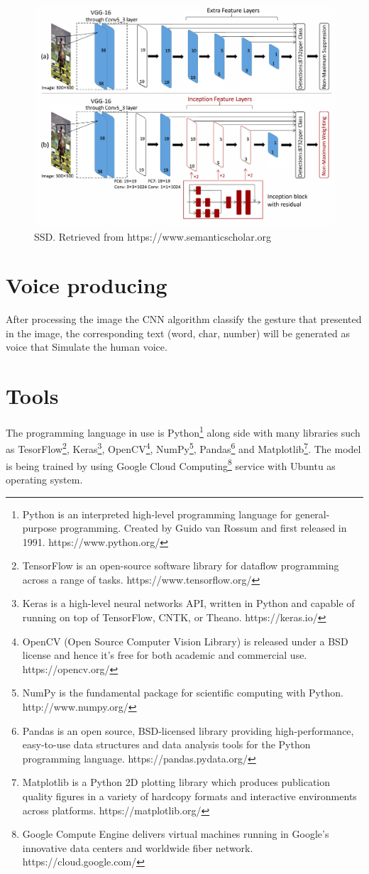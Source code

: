 \documentclass[12pt]{report}
\begin{document}
\begin{figure}[h]
    \centering
    \includegraphics[width=.7\textwidth]{./images/ssd.png}
    \caption{SSD. Retrieved from https://www.semanticscholar.org}
    \label{fig:frcnn}
\end{figure} 



\section{Voice producing}

After processing the image the CNN algorithm classify the gesture
that presented in the image, the corresponding text (word, char, number)
will be generated as voice that Simulate the human voice. 

\section{Tools}

The programming language in use is Python\footnote{Python is an interpreted
high-level programming language for general-purpose programming. Created by
Guido van Rossum and first released in 1991. https://www.python.org/} 
along side with many
libraries such as TesorFlow\footnote{TensorFlow is an open-source software 
library for dataflow programming across a range of tasks. https://www.tensorflow.org/},
Keras\footnote{Keras is a high-level neural networks API, written in Python and 
capable of running on top of TensorFlow, CNTK, or Theano. https://keras.io/}, 
OpenCV\footnote{OpenCV (Open Source Computer Vision Library) is released under 
a BSD license and hence it’s free for both academic and commercial use.
https://opencv.org/}, NumPy\footnote{NumPy is the fundamental package for 
scientific computing with Python. http://www.numpy.org/}, 
Pandas\footnote{Pandas is an open source, BSD-licensed library providing 
high-performance, easy-to-use data structures and data analysis tools for 
the Python programming language. https://pandas.pydata.org/}
and Matplotlib\footnote{Matplotlib is a Python 2D plotting library 
which produces publication quality figures in a variety of hardcopy 
formats and interactive environments across platforms. https://matplotlib.org/}.
The model is being trained by using Google Cloud Computing\footnote{Google Compute 
Engine delivers virtual machines running in Google's innovative data centers and
worldwide fiber network. https://cloud.google.com/} service with Ubuntu as 
operating system.


\renewcommand\bibname{References}            


\end{document}
